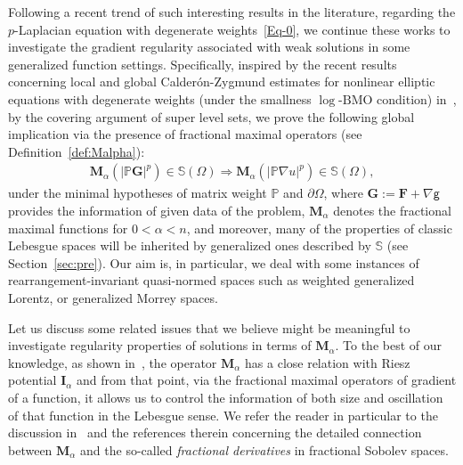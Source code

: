 \documentclass[a4paper, 11pt]{article}
\begin{document}
Following a recent trend of such interesting results in the literature, regarding the $p$-Laplacian equation with degenerate weights~\eqref{Eq-0}, we continue these works to investigate the gradient regularity associated with weak solutions in some generalized function settings. Specifically, inspired by the recent results concerning local and global Calder\'on-Zygmund estimates for nonlinear elliptic equations with degenerate weights (under the smallness $\log$-$\mathrm{BMO}$ condition) in~\cite{BDGN2022, BBDL2023}, by the covering argument of super level sets, we prove the following global implication via the presence of fractional maximal operators (see Definition~\ref{def:Malpha}):
\begin{align*}
\mathbf{M}_\alpha \left(|\mathbb{P} \mathbf{G}|^p \right) \in \mathbb{S}(\Omega) \Rightarrow \mathbf{M}_\alpha \left(|\mathbb{P} \nabla u|^p \right) \in \mathbb{S}(\Omega),
\end{align*}
under the minimal hypotheses of matrix weight $\mathbb{P}$ and $\partial\Omega$, where $\mathbf{G}:=\mathbf{F} + \nabla\mathsf{g}$ provides the information of given data of the problem, $\mathbf{M}_\alpha$ denotes the fractional maximal functions for $0<\alpha<n$, and moreover, many of the properties of classic Lebesgue spaces will be inherited by generalized ones described by $\mathbb{S}$ (see Section~\ref{sec:pre}). Our aim is, in particular, we deal with some instances of rearrangement-invariant quasi-normed spaces such as weighted generalized Lorentz, or generalized Morrey spaces.

Let us discuss some related issues that we believe might be meaningful to investigate regularity properties of solutions in terms of $\mathbf{M}_\alpha$. To the best of our knowledge, as shown in~\cite{Gilbarg1983, H1995, Hed1972}, the operator $\mathbf{M}_\alpha$ has a close relation with Riesz potential $\mathbf{I}_\alpha$ and from that point, via the fractional maximal operators of gradient of a function, it allows us to control the information of both size and oscillation of that function in the Lebesgue sense. We refer the reader in particular to the discussion in~\cite{KS2003, NPV2011} and the references therein concerning the detailed connection between $\mathbf{M}_\alpha$ and the so-called \emph{fractional derivatives} in fractional Sobolev spaces.
\end{document}
